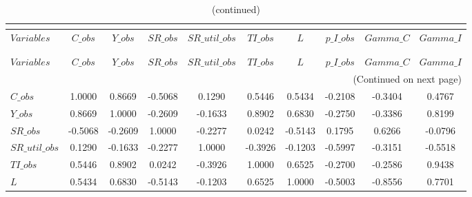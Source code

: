  
\begin{center}
\begin{longtable}{lccccccccc} 
\caption{MATRIX OF CORRELATIONS}\\
 \label{Table:th_corr_matrix}\\
\toprule 
$Variables      $	 & 	 $          C\_obs$	 & 	 $          Y\_obs$	 & 	 $         SR\_obs$	 & 	 $  SR\_util\_obs$	 & 	 $         TI\_obs$	 & 	 $                L$	 & 	 $      p\_I\_obs$	 & 	 $        Gamma\_C$	 & 	 $        Gamma\_I$\\
\midrule \endfirsthead 
\caption{(continued)}\\
 \toprule \\ 
$Variables      $	 & 	 $          C\_obs$	 & 	 $          Y\_obs$	 & 	 $         SR\_obs$	 & 	 $  SR\_util\_obs$	 & 	 $         TI\_obs$	 & 	 $                L$	 & 	 $      p\_I\_obs$	 & 	 $        Gamma\_C$	 & 	 $        Gamma\_I$\\
\midrule \endhead 
\midrule \multicolumn{10}{r}{(Continued on next page)} \\ \bottomrule \endfoot 
\bottomrule \endlastfoot 
$C\_obs         $	 & 	           1.0000	 & 	           0.8669	 & 	          -0.5068	 & 	           0.1290	 & 	           0.5446	 & 	           0.5434	 & 	          -0.2108	 & 	          -0.3404	 & 	           0.4767 \\ 
$Y\_obs         $	 & 	           0.8669	 & 	           1.0000	 & 	          -0.2609	 & 	          -0.1633	 & 	           0.8902	 & 	           0.6830	 & 	          -0.2750	 & 	          -0.3386	 & 	           0.8199 \\ 
$SR\_obs        $	 & 	          -0.5068	 & 	          -0.2609	 & 	           1.0000	 & 	          -0.2277	 & 	           0.0242	 & 	          -0.5143	 & 	           0.1795	 & 	           0.6266	 & 	          -0.0796 \\ 
$SR\_util\_obs  $	 & 	           0.1290	 & 	          -0.1633	 & 	          -0.2277	 & 	           1.0000	 & 	          -0.3926	 & 	          -0.1203	 & 	          -0.5997	 & 	          -0.3151	 & 	          -0.5518 \\ 
$TI\_obs        $	 & 	           0.5446	 & 	           0.8902	 & 	           0.0242	 & 	          -0.3926	 & 	           1.0000	 & 	           0.6525	 & 	          -0.2700	 & 	          -0.2586	 & 	           0.9438 \\ 
$L              $	 & 	           0.5434	 & 	           0.6830	 & 	          -0.5143	 & 	          -0.1203	 & 	           0.6525	 & 	           1.0000	 & 	          -0.5003	 & 	          -0.8556	 & 	           0.7701 \\ 

\end{longtable}
\end{center}
